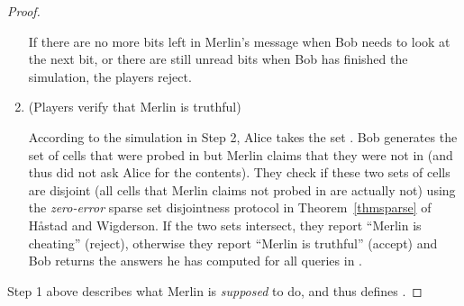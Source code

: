 \documentclass[11pt]{article}
\begin{document}
\begin{proof}
\begin{enumerate}[Step 1:]
		If there are no more bits left in Merlin's message when Bob needs to look at the next bit, or there are still unread bits when Bob has finished the simulation, the players reject. 
		
\item
		(Players verify that Merlin is truthful)
		
		According to the simulation in Step 2, Alice takes the set . Bob generates the set of cells that were probed in  but Merlin claims that they were not in  (and thus did not ask Alice for the contents). They check if these two sets of cells are disjoint (all cells that Merlin claims not probed in  are actually not) using the \emph{zero-error} sparse set disjointness protocol in Theorem~\ref{thmsparse} of H\aa{}stad and Wigderson. If the two sets intersect, they report ``Merlin is cheating'' (reject), otherwise they report ``Merlin is truthful'' (accept) and Bob returns the answers he has computed for all queries in . 
		
\end{enumerate}

Step 1 above describes what Merlin is \emph{supposed} to do, and thus defines . 
\iftoggle{conf}{
We can show that the protocol is a valid protocol in \mm{}, and solves the communication game efficiently. The detailed proof can be found in the full version.
}{
The following shows that the above protocol is a valid protocol in \mm{}, and solves the communication game efficiently. 

}
\end{proof}
\end{document}
